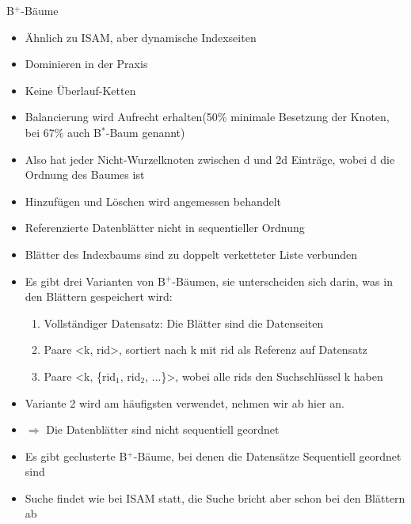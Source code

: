 \documentclass{article}
\begin{document}
\begin{block}{B$^+$-Bäume}
  \begin{itemize}
    \item Ähnlich zu ISAM, aber dynamische Indexseiten
    \item Dominieren in der Praxis
    \item Keine Überlauf-Ketten
    \item Balancierung wird Aufrecht erhalten(50\% minimale Besetzung der Knoten, bei 67\% auch B$^*$-Baum genannt)
    \item Also hat jeder Nicht-Wurzelknoten zwischen d und 2d Einträge, wobei d die Ordnung des Baumes ist
    \item Hinzufügen und Löschen wird angemessen behandelt
    \item Referenzierte Datenblätter nicht in sequentieller Ordnung
    \item Blätter des Indexbaums sind zu doppelt verketteter Liste verbunden
    \item Es gibt drei Varianten von B$^+$-Bäumen, sie unterscheiden sich darin, was in den Blättern gespeichert wird:
    \begin{enumerate}
      \item Vollständiger Datensatz: Die Blätter sind die Datenseiten
      \item Paare <k, rid>, sortiert nach k mit rid als Referenz auf Datensatz
      \item Paare <k, \{rid$_1$, rid$_2$, ...\}>, wobei alle rids den Suchschlüssel k haben
    \end{enumerate}
    \item Variante 2 wird am häufigsten verwendet, nehmen wir ab hier an.
    \item $\Rightarrow$ Die Datenblätter sind nicht sequentiell geordnet
    \item Es gibt geclusterte B$^+$-Bäume, bei denen die Datensätze Sequentiell geordnet sind
    \item Suche findet wie bei ISAM statt, die Suche bricht aber schon bei den Blättern ab
  \end{itemize}
\end{block}
\end{document}
